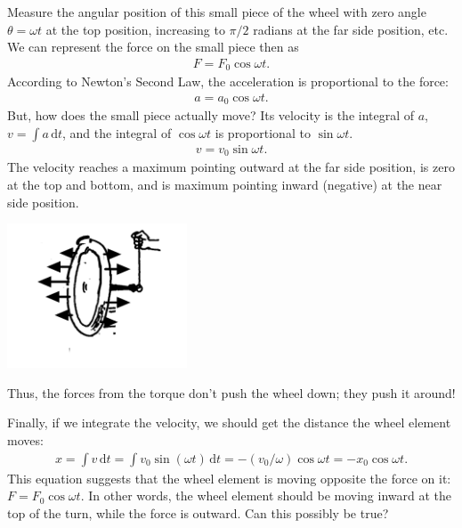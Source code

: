 Measure the angular position of this small piece of the wheel with zero angle \(\theta = \omega t\) at the top position, increasing to \(\pi/2\) radians at the far side position, etc.  We can represent the force on the small piece then as
\begin{align} F = F_0\cos\omega t. \label{6Aexp7_eqn_9} \end{align}
According to Newton's Second Law, the acceleration is proportional to the force:
\begin{align} a = a_0\cos\omega t. \label{6Aexp7_eqn_10} \end{align}
But, how does the small piece actually move?  Its velocity is the integral of \(a\), \(v = \int a\,\textrm{d}t\), and the integral of \(\cos\omega t\) is proportional to \(\sin\omega t\).
\begin{align} v = v_0\sin\omega t. \label{6Aexp7_eqn_11} \end{align}
The velocity reaches a maximum pointing outward at the far side position, is zero at the top and bottom, and is maximum pointing inward (negative) at the near side position.
\begin{center} \includegraphics*[width=0.4\textwidth]{imgs/6labs/6Alab/6Aexp7/6A-exp7_fig9.png} \end{center}
Thus, the forces from the torque don't push the wheel down; they push it around!

Finally, if we integrate the velocity, we should get the distance the wheel element moves:
\begin{align} x = \int v\,\textrm{d}t = \int v_0\sin(\omega t)\,\textrm{d}t = -(v_0/\omega)\cos\omega t = -x_0\cos\omega t. \label{6Aexp7_eqn_12} \end{align}
This equation suggests that the wheel element is moving opposite the force on it: \(F = F_0\cos\omega t\).  In other words, the wheel element should be moving inward at the top of the turn, while the force is outward.  Can this possibly be true?

